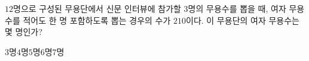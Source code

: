\hspace*{2mm}\begin{minipage}[t]{\dimexpr\linewidth-2mm\relax}\vspace{0pt}
$12$명으로 구성된 무용단에서 신문 인터뷰에 참가할 $3$명의 무용수를 뽑을 때, 여자 무용수를 적어도 한 명 포함하도록 뽑는 경우의 수가 $210$이다. 이 무용단의 여자 무용수는 몇 명인가?
\begin{choices32}{$3$명}{$4$명}{$5$명}{$6$명}{$7$명}\end{choices32}\end{minipage}
